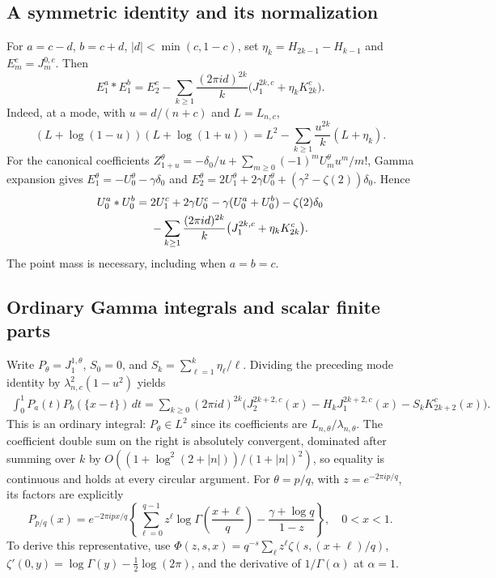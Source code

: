 \subsection{A symmetric identity and its normalization}
For $a=c-d$, $b=c+d$, $|d|<\min(c,1-c)$, set
$\eta_k=H_{2k-1}-H_{k-1}$ and $E_m^c=J_m^{0,c}$. Then
\begin{equation}
 E_1^a*E_1^b=E_2^c-
   \sum_{k\ge1}\frac{(2\pi id)^{2k}}k
              \bigl(J_1^{2k,c}+\eta_kK_{2k}^c\bigr).
 \label{utj:eq:symmetric}
\end{equation}
Indeed, at a mode, with $u=d/(n+c)$ and $L=L_{n,c}$,
\[
 (L+\log(1-u))(L+\log(1+u))
   =L^2-\sum_{k\ge1}\frac{u^{2k}}k(L+\eta_k).
\]
For the canonical coefficients
$Z_{1+u}^\theta=-\delta_0/u+\sum_{m\ge0}(-1)^mU_m^\theta u^m/m!$,
Gamma expansion gives
$E_1^\theta=-U_0^\theta-\gamma\delta_0$ and
$E_2^\theta=2U_1^\theta+2\gamma U_0^\theta+
(\gamma^2-\zeta(2))\delta_0$. Hence
\begin{align}
 U_0^a*U_0^b={}&2U_1^c+2\gamma U_0^c-\gamma(U_0^a+U_0^b)
                 -\zeta(2)\delta_0\notag\\
 &-\sum_{k\ge1}\frac{(2\pi id)^{2k}}k
              \bigl(J_1^{2k,c}+\eta_kK_{2k}^c\bigr).
 \label{utj:eq:contact}
\end{align}
The point mass is necessary, including when $a=b=c$.

\subsection{Ordinary Gamma integrals and scalar finite parts}
Write $P_\theta=J_1^{1,\theta}$, $S_0=0$, and
$S_k=\sum_{\ell=1}^k\eta_\ell/\ell$. Dividing the preceding mode
identity by $\lambda_{n,c}^2(1-u^2)$ yields
\begin{align}
 \int_0^1P_a(t)P_b(\{x-t\})\,dt
   =\sum_{k\ge0}(2\pi id)^{2k}
       \bigl(J_2^{2k+2,c}(x)-H_kJ_1^{2k+2,c}(x)
                              -S_kK_{2k+2}^c(x)\bigr).
 \label{utj:eq:gamma}
\end{align}
This is an ordinary integral: $P_\theta\in L^2$ since its coefficients
are $L_{n,\theta}/\lambda_{n,\theta}$. The coefficient double sum on
the right is absolutely convergent, dominated after summing over $k$
by $O((1+\log^2(2+|n|))/(1+|n|)^2)$, so equality is continuous and
holds at every circular argument. For $\theta=p/q$, with
$z=e^{-2\pi ip/q}$, its factors are explicitly
\begin{equation}
 P_{p/q}(x)=e^{-2\pi ipx/q}\left\{
  \sum_{\ell=0}^{q-1}z^\ell\log\Gamma\left(\frac{x+\ell}{q}\right)
                 -\frac{\gamma+\log q}{1-z}\right\},\quad 0<x<1.
 \label{utj:eq:gammafactor}
\end{equation}
To derive this representative, use
$\Phi(z,s,x)=q^{-s}\sum_\ell z^\ell\zeta(s,(x+\ell)/q)$,
$\zeta'(0,y)=\log\Gamma(y)-\tfrac12\log(2\pi)$, and the derivative
of $1/\Gamma(\alpha)$ at $\alpha=1$.

